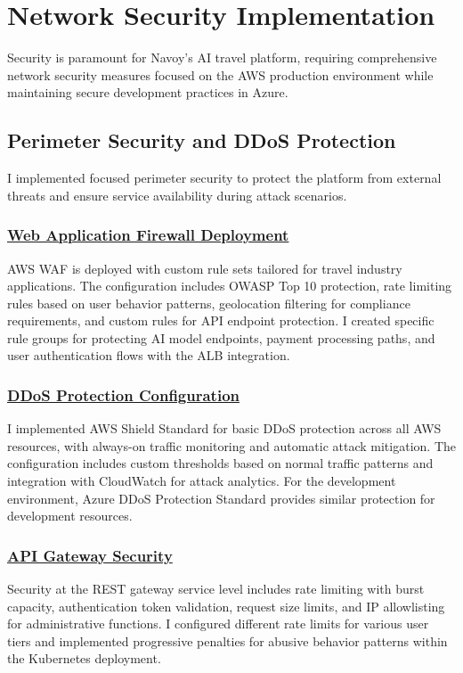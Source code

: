 \section{Network Security Implementation}
Security is paramount for Navoy's AI travel platform, requiring comprehensive network security measures focused on the AWS production environment while maintaining secure development practices in Azure.

\subsection{Perimeter Security and DDoS Protection}
I implemented focused perimeter security to protect the platform from external threats and ensure service availability during attack scenarios.

\subsubsection*{\underline{Web Application Firewall Deployment}}
AWS WAF is deployed with custom rule sets tailored for travel industry applications. The configuration includes OWASP Top 10 protection, rate limiting rules based on user behavior patterns, geolocation filtering for compliance requirements, and custom rules for API endpoint protection. I created specific rule groups for protecting AI model endpoints, payment processing paths, and user authentication flows with the ALB integration.

\subsubsection*{\underline{DDoS Protection Configuration}}
I implemented AWS Shield Standard for basic DDoS protection across all AWS resources, with always-on traffic monitoring and automatic attack mitigation. The configuration includes custom thresholds based on normal traffic patterns and integration with CloudWatch for attack analytics. For the development environment, Azure DDoS Protection Standard provides similar protection for development resources.

\subsubsection*{\underline{API Gateway Security}}
Security at the REST gateway service level includes rate limiting with burst capacity, authentication token validation, request size limits, and IP allowlisting for administrative functions. I configured different rate limits for various user tiers and implemented progressive penalties for abusive behavior patterns within the Kubernetes deployment.

